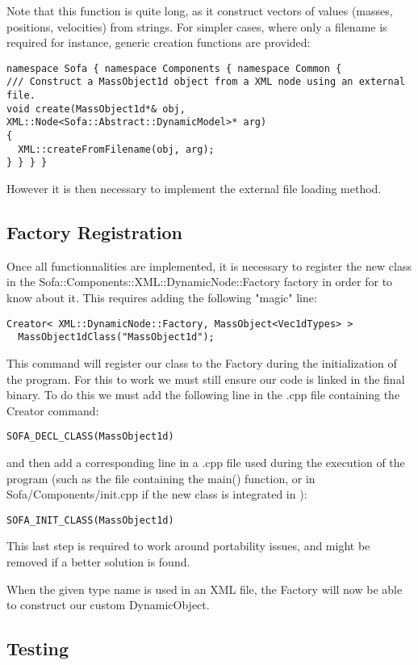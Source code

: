 Note that this function is quite long, as it construct vectors of values (masses, positions, velocities) from strings. For simpler cases, where only a filename is required for instance, generic creation functions are provided:
\begin{verbatim}
namespace Sofa { namespace Components { namespace Common {
/// Construct a MassObject1d object from a XML node using an external file.
void create(MassObject1d*& obj, XML::Node<Sofa::Abstract::DynamicModel>* arg)
{
  XML::createFromFilename(obj, arg);
} } } }
\end{verbatim}
However it is then necessary to implement the external file loading method.

\subsection{Factory Registration}

Once all functionnalities are implemented, it is necessary to register the new class in the Sofa::Components::XML::DynamicNode::Factory factory in order for \sofa{} to know about it. This requires adding the following "magic" line:

\begin{verbatim}
Creator< XML::DynamicNode::Factory, MassObject<Vec1dTypes> >
  MassObject1dClass("MassObject1d");
\end{verbatim}

This command will register our class to the Factory during the initialization of the program. For this to work we must still ensure our code is linked in the final binary. To do this we must add the following line in the .cpp file containing the Creator command:
\begin{verbatim}
SOFA_DECL_CLASS(MassObject1d)
\end{verbatim}
and then add a corresponding line in a .cpp file used during the execution of the program (such as the file containing the main() function, or in Sofa/Components/init.cpp if the new class is integrated in \sofa{}):
\begin{verbatim}
SOFA_INIT_CLASS(MassObject1d)
\end{verbatim}
This last step is required to work around portability issues, and might be removed if a better solution is found.

When the given type name is used in an XML file, the Factory will now be able to construct our custom DynamicObject.

\subsection{Testing}

